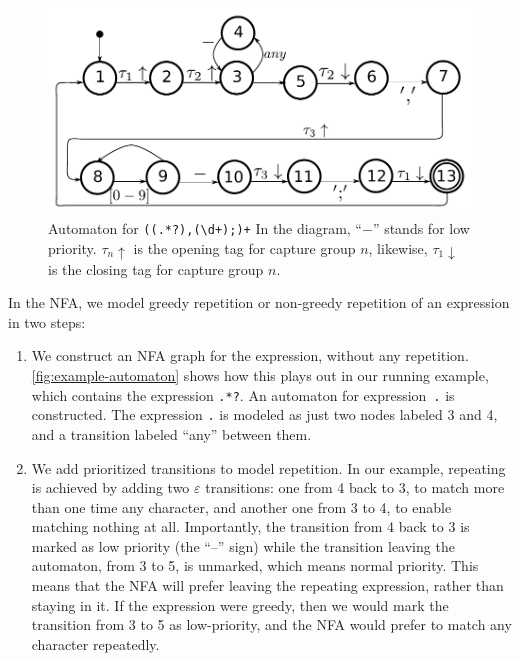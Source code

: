 \documentclass[english,twocolumn]{article}
\theoremstyle{definition}
\begin{document}
\begin{figure}[htp]
\includegraphics[width=\linewidth]{graphs/lehrer_automaton}

\caption{\label{fig:example-automaton}
Automaton for \texttt{((.*?),(\textbackslash{}d+);)+} 
In the diagram, ``$-$'' stands for low priority. $\tau_n\uparrow$ is the opening tag for capture group $n$, likewise, $\tau_1\downarrow$ is the closing tag for capture group $n$.}
\end{figure}


In the NFA, we model greedy repetition or non-greedy repetition of
an expression in two steps:

\begin{enumerate}
\item We construct an NFA graph for the expression, without any
repetition.  \autoref{fig:example-automaton} shows how this plays
out in our running example, which contains the expression \texttt{.*?}.
An automaton for expression~\texttt{.} is constructed. The expression
\texttt{.} is modeled as just two nodes labeled 3 and 4, and a
transition labeled ``any'' between them.

\item We add prioritized transitions to model repetition. In our
example, repeating is achieved by adding two $\varepsilon$ transitions:
one from 4 back to 3, to match more than one time any character,
and another one from 3 to 4, to enable matching nothing at all.
Importantly, the transition from 4 back to 3 is marked as low
priority (the ``--'' sign) while the transition leaving the automaton,
from 3 to 5, is unmarked, which means normal priority.  This means
that the NFA will prefer leaving the repeating expression, rather
than staying in it.  If the expression were greedy, then we would
mark the transition from 3 to 5 as low-priority, and the NFA would
prefer to match any character repeatedly.

\end{enumerate}
\end{document}
